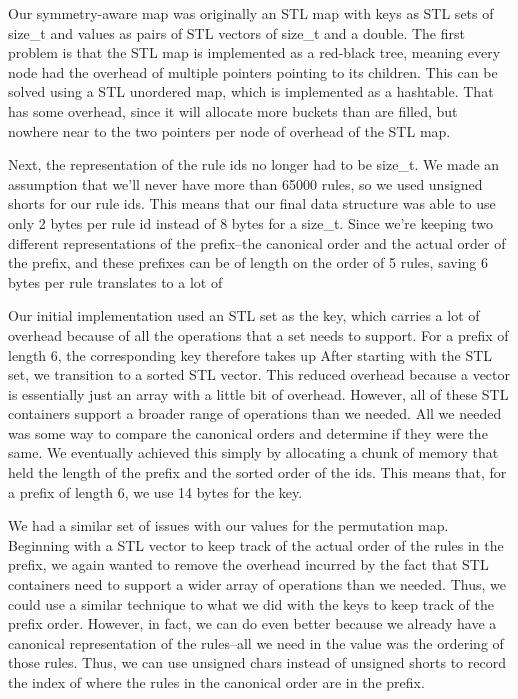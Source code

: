 Our symmetry-aware map was originally an STL map with keys as STL sets of size\_t and values as pairs of STL vectors of size\_t and a double.
The first problem is that the STL map is implemented as a red-black tree, meaning every node had the overhead of multiple pointers pointing to its children.
This can be solved using a STL unordered map, which is implemented as a hashtable.
That has some overhead, since it will allocate more buckets than are filled, but nowhere near to the two pointers per node of overhead of the STL map.

Next, the representation of the rule ids no longer had to be size\_t.
We made an assumption that we'll never have more than 65000 rules, so we used unsigned shorts for our rule ids.
This means that our final data structure was able to use only 2 bytes per rule id instead of 8 bytes for a size\_t.
Since we're keeping two different representations of the prefix--the canonical order and the actual order of the prefix, and these prefixes can be of length on the order of 5 rules, saving 6 bytes per rule translates to a lot of 

Our initial implementation used an STL set as the key, which carries a lot of overhead because of all the operations that a set needs to support.
For a prefix of length 6, the corresponding key therefore takes up 
After starting with the STL set, we transition to a sorted STL vector.
This reduced overhead because a vector is essentially just an array with a little bit of overhead.
However, all of these STL containers support a broader range of operations than we needed.
All we needed was some way to compare the canonical orders and determine if they were the same.
We eventually achieved this simply by allocating a chunk of memory that held the length of the prefix and the sorted order of the ids.
This means that, for a prefix of length 6, we use 14 bytes for the key.

We had a similar set of issues with our values for the permutation map.
Beginning with a STL vector to keep track of the actual order of the rules in the prefix, we again wanted to remove the overhead incurred by the fact that STL containers need to support a wider array of operations than we needed.
Thus, we could use a similar technique to what we did with the keys to keep track of the prefix order.
However, in fact, we can do even better because we already have a canonical representation of the rules--all we need in the value was the ordering of those rules.
Thus, we can use unsigned chars instead of unsigned shorts to record the index of where the rules in the canonical order are in the prefix.

